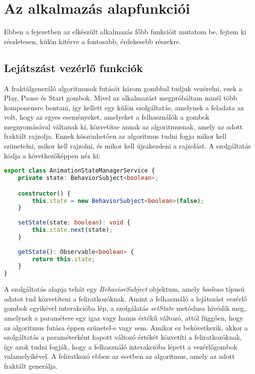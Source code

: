 \chapter{Az alkalmazás alapfunkciói}

Ebben a fejezetben az elkészült alkalmazás főbb funkcióit mutatom be, fejtem ki részletesen, külön kitérve a fontosabb, érdekesebb részekre.

\section{Lejátszást vezérlő funkciók}

A fraktálgeneráló algoritmusok futását három gombbal tudjuk vezérelni, ezek a Play, Pause és Start gombok. Mivel az alkalmazást megpróbáltam minél több komponensre bontani, így kellett egy külön szolgáltatás, amelynek a feladata az volt, hogy az egyes eseményeket, amelyeket a felhasználók a gombok megnyomásával váltanak ki, közvetítse annak az algoritmusnak, amely az adott fraktált rajzolja. Ennek köszönhetően az algoritmus tudni fogja mikor kell szünetelni, mikor kell rajzolni, és mikor kell újrakezdeni a rajzolást. A szolgáltatás kódja a következőképpen néz ki:
\begin{lstlisting}[language=typescript]
export class AnimationStateManagerService {
	private state: BehaviorSubject<boolean>;

	constructor() {
		this.state = new BehaviorSubject<boolean>(false);
	}
	
	setState(state: boolean): void {
		this.state.next(state);
	}
	
	getState(): Observable<boolean> {
		return this.state;
	}
}
\end{lstlisting}
A szolgáltatás alapja tehát egy {\it BehaviorSubject} objektum, amely {\it boolean} típusú adatot tud közvetíteni a feliratkozóknak. Amint a felhasználó a lejátszást vezérlő gombok egyikével interakcióba lép, a szolgálatás {\it setState} metódusa hívódik meg, amelynek a paramétere egy igaz vagy hamis értékű változó, attól függően, hogy az algoritmus futása éppen szünetel-e vagy sem. Amikor ez bekövetkezik, akkor a szolgáltatás a paraméterként kapott változó értékét közvetíti a feliratkozóknak, így azok tudni fogják, hogy a felhasználó interakcióba lépett a vezérlőgombok valamelyikével. A feliratkozó ebben az esetben az algoritmus, amely az adott fraktált generálja.

